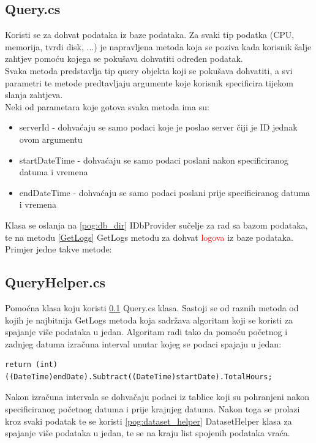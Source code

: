 \documentclass[zavrsnirad]{fer}
\begin{document}
\subsection{Query.cs}
\label{pog:query.cs}
Koristi se za dohvat podataka iz baze podataka. Za svaki tip podatka (CPU, memorija, tvrdi disk, ...) je napravljena metoda koja se poziva kada korisnik šalje zahtjev pomoću kojega se pokušava dohvatiti određen podatak.
\\Svaka metoda predstavlja tip query objekta koji se pokušava dohvatiti, a svi parametri te metode predtavljaju argumente koje korisnik specificira tijekom slanja zahtjeva.
\\Neki od parametara koje gotova svaka metoda ima su:
\begin{itemize}
	\item serverId - dohvaćaju se samo podaci koje je poslao server čiji je ID jednak ovom argumentu
	\item startDateTime - dohvaćaju se samo podaci poslani nakon specificiranog datuma i vremena
	\item endDateTime - dohvaćaju se samo podaci poslani prije specificiranog datuma i vremena
\end{itemize}
Klasa se oslanja na \ref{pog:db_dir} IDbProvider sučelje za rad sa bazom podataka, te na metodu \ref{GetLogs} GetLogs metodu za dohvat \textcolor{red}{logova} iz baze podataka.
\\Primjer jedne takve metode:


\subsection{QueryHelper.cs}
Pomoćna klasa koju koristi \ref{pog:query.cs} Query.cs klasa. Sastoji se od raznih metoda od kojih je najbitnija GetLogs metoda koja sadržava algoritam koji se koristi za spajanje više podataka u jedan. Algoritam radi tako da pomoću početnog i zadnjeg datuma izračuna interval unutar kojeg se podaci spajaju u jedan:
\begin{lstlisting}[language=CSharp, title=Izračun intervala]
return (int)((DateTime)endDate).Subtract((DateTime)startDate).TotalHours;
\end{lstlisting}

Nakon izračuna intervala se dohvačaju podaci iz tablice koji su pohranjeni nakon specificiranog početnog datuma i prije krajnjeg datuma. Nakon toga se prolazi kroz svaki podatak te se koristi \ref{pog:dataset_helper} DatasetHelper klasa za spajanje više podataka u jedan, te se na kraju list spojenih podataka vraća.
\end{document}
